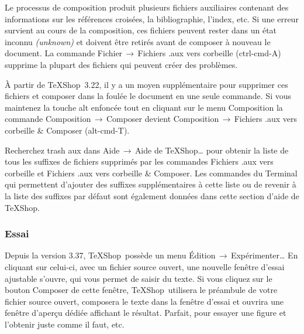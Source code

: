 \documentclass[11pt,french]{article}
\newcommand{\TS}{\textsf{\TeX Shop}}
\newcommand{\cmd}[1]{\textsf{#1}}
\newcommand{\mnu}[1]{\textsf{#1}}
\newcommand{\To}{\,\(\to\)\,}
\begin{document}
Le processus de composition produit plusieurs fichiers auxiliaires contenant des informations sur les références croisées, la bibliographie, l'index, etc. Si une erreur survient au cours de la composition, ces fichiers peuvent rester dans un état inconnu \emph{(unknown)} et doivent être retirés avant de composer à nouveau le document. La commande \mnu{Fichier}\To\mnu{Fichiers .aux vers corbeille} (\cmd{ctrl-cmd-A}) supprime la plupart des fichiers qui peuvent créer des problèmes. 

À partir de \TS\ 3.22, il y a un moyen supplémentaire pour supprimer ces fichiers et composer dans la foulée le document en une seule commande. Si vous maintenez la touche \cmd{alt} enfoncée tout en cliquant sur le menu \mnu{Composition} la commande \mnu{Composition}\To\mnu{Composer} devient \mnu{Composition}\To\mnu{Fichiers .aux vers corbeille \& Composer} (\cmd{alt-cmd-T}). 

Recherchez \cmd{trash aux} dans \mnu{Aide}\To\mnu{Aide de TeXShop…} pour obtenir la liste de tous les suffixes de fichiers supprimés par les commandes \mnu{Fichiers .aux vers corbeille} et \mnu{Fichiers .aux vers corbeille \& Composer}. Les commandes du \cmd{Terminal} qui permettent d'ajouter des suffixes supplémentaires à cette liste ou de revenir à la liste des suffixes par défaut sont également données dans cette section d'aide de \TS.

\subsubsection{Essai}


Depuis la version 3.37, \TS\ possède un menu \mnu{Édition}\To\mnu {Expérimenter…} En cliquant sur celui-ci, avec un fichier source ouvert, une nouvelle fenêtre d'essai ajustable s'ouvre, qui vous permet de saisir du texte. Si vous cliquez sur le bouton \mnu{Composer} de cette fenêtre, \TS\ utilisera le préambule de votre fichier source ouvert, composera le texte dans la fenêtre d'essai et ouvrira une fenêtre d'aperçu dédiée affichant le résultat. Parfait, pour essayer une figure et l'obtenir juste comme il faut, etc.
\end{document}

